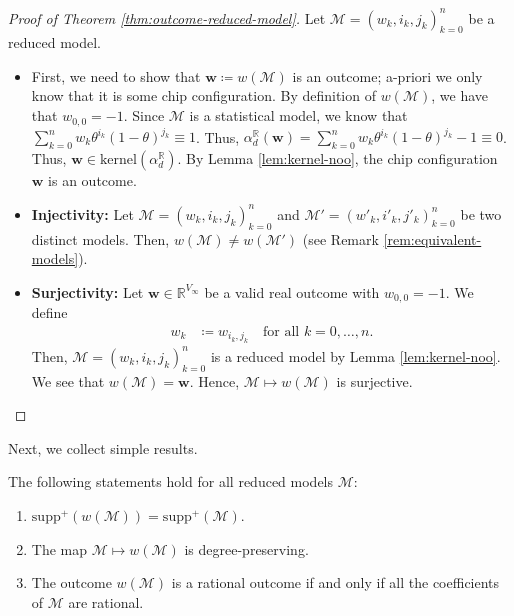 \begin{proof}[Proof of Theorem \ref{thm:outcome-reduced-model}]
    Let \( \mathcal{M} = (w_k,i_k,j_k)_{k=0}^n \) be a reduced model. 

    \begin{itemize}
        \item First, we need to show that \( \mathbf w \coloneqq w(\mathcal{M}) \) is an outcome; a-priori we only know that it is some chip configuration. By definition of \( w(\mathcal{M}) \), we have that \( w_{0,0} = -1 \). Since \( \mathcal{M} \) is a statistical model, we know that \( \sum_{k=0}^n w_k \theta^{i_k} (1-\theta)^{j_k} \equiv 1 \). Thus, \( \alpha_d^{\mathbb R}(\mathbf w) = \sum_{k=0}^n w_k \theta^{i_k} (1-\theta)^{j_k} -1 \equiv 0 \). Thus, \( \mathbf{w} \in \mathrm{kernel}(\alpha_d^{\mathbb R}) \). By Lemma \ref{lem:kernel-noo}, the chip configuration \( \mathbf w \) is an outcome.
        
        \item \textbf{Injectivity:} Let \( \mathcal{M} = (w_k,i_k,j_k)^n_{k=0} \) and \( \mathcal{M}' = (w'_k,i'_k,j'_k)^n_{k=0} \) be two distinct models. Then, \( w(\mathcal{M}) \neq w(\mathcal{M}') \) (see Remark \ref{rem:equivalent-models}). 
        
        \item \textbf{Surjectivity:} Let \( \mathbf w \in \mathbb{R}^{V_\infty} \) be a valid real outcome with \( w_{0,0} = -1 \). We define 
        \begin{align*}
            w_k &\coloneqq w_{i_k,j_k} \quad \text{for all } k = 0, \dots, n.
        \end{align*}
        Then, \( \mathcal{M}= (w_k,i_k,j_k)^n_{k=0} \) is a reduced model by Lemma \ref{lem:kernel-noo}. We see that \( w(\mathcal{M}) = \mathbf w \). Hence, \( \mathcal{M} \mapsto w(\mathcal{M}) \) is surjective.
    \end{itemize}
\end{proof}

Next, we collect simple results.

\begin{proposition}\label{prop:outcome-properties-bllaio}
    The following statements hold for all reduced models \( \mathcal{M} \):
    \begin{enumerate}
        \item \( \mathrm{supp}^+(w(\mathcal{M})) = \mathrm{supp}^+(\mathcal{M})\).
        \item The map \( \mathcal{M} \mapsto w(\mathcal{M}) \) is degree-preserving.
        \item The outcome \( w(\mathcal{M}) \) is a rational outcome if and only if all the coefficients of \( \mathcal{M} \) are rational.
    \end{enumerate}
\end{proposition}

